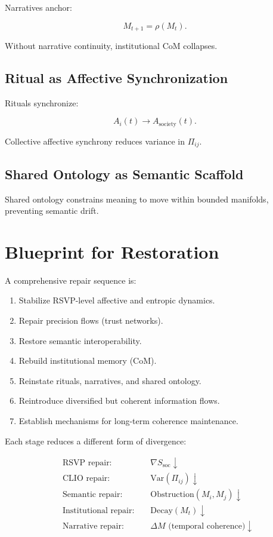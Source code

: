 \documentclass[12pt,oneside]{book}
\theoremstyle{plain}
\theoremstyle{definition}
\begin{document}
Narratives anchor:

\[
M_{t+1} = \rho(M_t).
\]

Without narrative continuity, institutional CoM collapses.

\subsection{Ritual as Affective Synchronization}

Rituals synchronize:

\[
A_i(t) \to A_{\mathrm{society}}(t).
\]

Collective affective synchrony reduces variance in $\Pi_{ij}$.

\subsection{Shared Ontology as Semantic Scaffold}

Shared ontology constrains meaning to move within bounded manifolds, preventing  
semantic drift.

\section{Blueprint for Restoration}

A comprehensive repair sequence is:

\begin{enumerate}
    \item Stabilize RSVP-level affective and entropic dynamics.
    \item Repair precision flows (trust networks).
    \item Restore semantic interoperability.
    \item Rebuild institutional memory (CoM).
    \item Reinstate rituals, narratives, and shared ontology.
    \item Reintroduce diversified but coherent information flows.
    \item Establish mechanisms for long-term coherence maintenance.
\end{enumerate}

Each stage reduces a different form of divergence:

\[
\begin{aligned}
&\text{RSVP repair: } && \nabla S_{\mathrm{soc}} \downarrow \\
&\text{CLIO repair: } && \mathrm{Var}(\Pi_{ij}) \downarrow \\
&\text{Semantic repair: } && \mathrm{Obstruction}(M_i,M_j) \downarrow \\
&\text{Institutional repair: } && \mathrm{Decay}(M_t) \downarrow \\
&\text{Narrative repair: } && \Delta M \text{ (temporal coherence)} \downarrow 
\end{aligned}
\]
\end{document}
